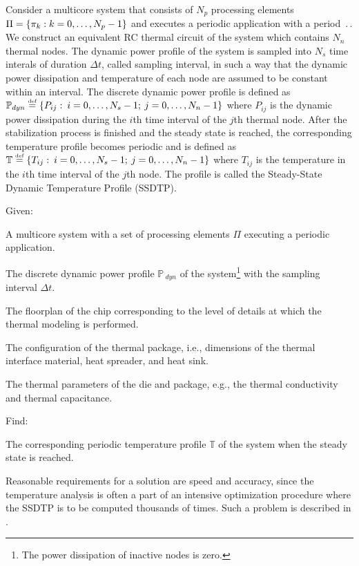 Consider a multicore system that consists of $N_p$ processing elements $\Pi = \{ \pi_k: k = 0, \dots, N_p - 1 \}$ and executes a periodic application with a period $\period$. We construct an equivalent RC thermal circuit of the system which contains $N_n$ thermal nodes. The dynamic power profile of the system is sampled into $N_s$ time interals of duration $\Delta t$, called sampling interval, in such a way that the dynamic power dissipation and temperature of each node are assumed to be constant within an interval. The discrete dynamic power profile is defined as $\mathbb{P}_{dyn} \eqdef \{ P_{ij}: \: i = \range{0}{N_s - 1}; \: j = \range{0}{N_n - 1} \}$ where $P_{ij}$ is the dynamic power dissipation during the $i$th time interval of the $j$th thermal node. After the stabilization process is finished and the steady state is reached, the corresponding temperature profile becomes periodic and is defined as $\mathbb{T} \eqdef \{ T_{ij}: \: i = \range{0 }{N_s - 1}; \: j = \range{0}{N_n - 1} \}$ where $T_{ij}$ is the temperature in the $i$th time interval of the $j$th node. The profile is called the Steady-State Dynamic Temperature Profile (SSDTP).

Given:
\begin{ilist}
  \item A multicore system with a set of processing elements $\Pi$ executing a periodic application.
  \item The discrete dynamic power profile $\mathbb{P}_{\:dyn}$ of the system\footnote{The power dissipation of inactive nodes is zero.} with the sampling interval $\Delta t$.
  \item The floorplan of the chip corresponding to the level of details at which the thermal modeling is performed.
  \item The configuration of the thermal package, i.e., dimensions of the thermal interface material, heat spreader, and heat sink.
  \item The thermal parameters of the die and package, e.g., the thermal conductivity and thermal capacitance.
\end{ilist}

Find:
\begin{ilist}
  \item The corresponding periodic temperature profile $\mathbb{T}$ of the system when the steady state is reached.
\end{ilist}

Reasonable requirements for a solution are speed and accuracy, since the temperature analysis is often a part of an intensive optimization procedure where the SSDTP is to be computed thousands of times. Such a problem is described in .
